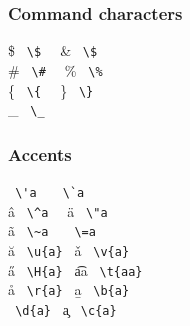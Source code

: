 \subsubsection{Command characters}
\begin{tabbing}
\mySymbolss
\$   \>  \verb` \$  ` \> \&  \>  \verb` \$ `  \\
\#   \>  \verb` \#  ` \> \%  \>  \verb` \% `  \\
\{   \>  \verb` \{  ` \> \}  \>  \verb` \} `  \\
\_   \>  \verb` \_  ` \>   \\
\end{tabbing}
\subsubsection{Accents}
\newsavebox{\mySa}

\newsavebox{\mySb}

\newsavebox{\mySc}

\begin{tabbing}
\mySymbolss
\usebox{\mySb}     \>  \verb` \'a  `  \> \usebox{\mySc}    \>   \verb" \`a "    \\
\^a     \>  \verb` \^a  `  \> \"a    \>   \verb` \"a `    \\
\~a     \>  \verb` \~a  `  \> \usebox{\mySa}    \>   \verb` \=a `    \\
\u{a}   \>  \verb` \u{a} ` \> \v{a}   \>  \verb` \v{a} `  \\
\H{a}   \>  \verb` \H{a} ` \> \t{aa}  \>  \verb` \t{aa}`  \\
\r{a}   \>  \verb` \r{a} ` \> \b{a}   \>  \verb` \b{a} `  \\
\usebox{\mySd} \> \verb` \d{a} `  \> \c{a} \>  \verb` \c{a} `  \\
\end{tabbing}


